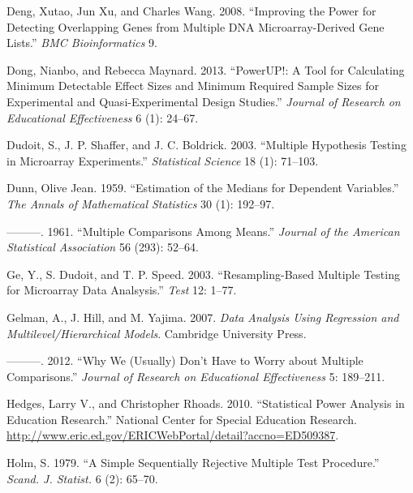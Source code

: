 \documentclass{article}
\newlength{\cslhangindent}
\newlength{\cslentryspacingunit} %
\newenvironment{CSLReferences}[2] %
 {%
  \setlength{\parindent}{0pt}
  \ifodd #1
  \let\oldpar\par
  \def\par{\hangindent=\cslhangindent\oldpar}
  \fi
  \setlength{\parskip}{#2\cslentryspacingunit}
 }%
 {}
\begin{document}
\begin{CSLReferences}{1}{0}
\leavevmode{}%
Deng, Xutao, Jun Xu, and Charles Wang. 2008. {``Improving the Power for
Detecting Overlapping Genes from Multiple DNA Microarray-Derived Gene
Lists.''} \emph{BMC Bioinformatics} 9.

\leavevmode{}%
Dong, Nianbo, and Rebecca Maynard. 2013. {``PowerUP!: A Tool for
Calculating Minimum Detectable Effect Sizes and Minimum Required Sample
Sizes for Experimental and Quasi-Experimental Design Studies.''}
\emph{Journal of Research on Educational Effectiveness} 6 (1): 24--67.

\leavevmode{}%
Dudoit, S., J. P. Shaffer, and J. C. Boldrick. 2003. {``Multiple
Hypothesis Testing in Microarray Experiments.''} \emph{Statistical
Science} 18 (1): 71--103.

\leavevmode{}%
Dunn, Olive Jean. 1959. {``Estimation of the Medians for Dependent
Variables.''} \emph{The Annals of Mathematical Statistics} 30 (1):
192--97.

\leavevmode{}%
---------. 1961. {``Multiple Comparisons Among Means.''} \emph{Journal
of the American Statistical Association} 56 (293): 52--64.

\leavevmode{}%
Ge, Y., S. Dudoit, and T. P. Speed. 2003. {``Resampling-Based Multiple
Testing for Microarray Data Analsysis.''} \emph{Test} 12: 1--77.

\leavevmode{}%
Gelman, A., J. Hill, and M. Yajima. 2007. \emph{Data Analysis Using
Regression and Multilevel/Hierarchical Models}. Cambridge University
Press.

\leavevmode{}%
---------. 2012. {``Why We (Usually) Don't Have to Worry about Multiple
Comparisons.''} \emph{Journal of Research on Educational Effectiveness}
5: 189--211.

\leavevmode{}%
Hedges, Larry V., and Christopher Rhoads. 2010. {``Statistical Power
Analysis in Education Research.''} National Center for Special Education
Research.
\url{http://www.eric.ed.gov/ERICWebPortal/detail?accno=ED509387}.

\leavevmode{}%
Holm, S. 1979. {``A Simple Sequentially Rejective Multiple Test
Procedure.''} \emph{Scand. J. Statist.} 6 (2): 65--70.


\end{CSLReferences}
\end{document}
